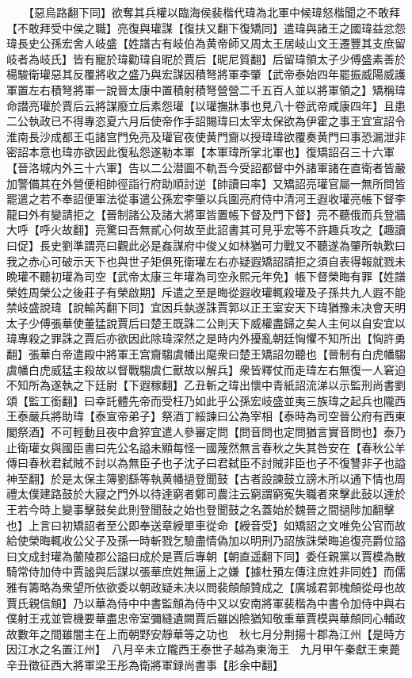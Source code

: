 　　【惡烏路翻下同】欲奪其兵權以臨海侯裴楷代瑋為北軍中候瑋怒楷聞之不敢拜【不敢拜受中侯之職】亮復與瓘謀【復扶又翻下復矯同】遣瑋與諸王之國瑋益忿怨瑋長史公孫宏舍人岐盛【姓譜古有岐伯為黄帝師又周太王居岐山文王遷豐其支庶留岐者為岐氏】皆有寵於瑋勸瑋自昵於賈后【昵尼質翻】后留瑋領太子少傅盛素善於楊駿衛瓘惡其反覆將收之盛乃與宏謀因積弩將軍李肇【武帝泰始四年罷振威陽威護軍置左右積弩將軍一說晉太康中置積射積弩營營二千五百人並以將軍領之】矯稱瑋命譛亮瓘於賈后云將謀廢立后素怨瓘【以瓘撫牀事也見八十卷武帝咸康四年】且患二公執政已不得專恣夏六月后使帝作手詔賜瑋曰太宰太保欲為伊霍之事王宜宣詔令淮南長沙成都王屯諸宫門免亮及瓘官夜使黄門齎以授瑋瑋欲覆奏黄門曰事恐漏泄非密詔本意也瑋亦欲因此復私怨遂勒本軍【本軍瑋所掌北軍也】復矯詔召三十六軍【晉洛城内外三十六軍】告以二公潜圖不軌吾今受詔都督中外諸軍諸在直衛者皆嚴加警備其在外營便相帥徑詣行府助順討逆【帥讀曰率】又矯詔亮瓘官屬一無所問皆罷遣之若不奉詔便軍法從事遣公孫宏李肇以兵圍亮府侍中清河王遐收瓘亮帳下督李龍曰外有變請拒之【晉制諸公及諸大將軍皆置帳下督及門下督】亮不聽俄而兵登牆大呼【呼火故翻】亮驚曰吾無貳心何故至此詔書其可見乎宏等不許趣兵攻之【趣讀曰促】長史劉準謂亮曰觀此必是姦謀府中俊乂如林猶可力戰又不聽遂為肇所執歎曰我之赤心可破示天下也與世子矩俱死衛瓘左右亦疑遐矯詔請拒之須自表得報就戮未晩瓘不聽初瓘為司空【武帝太康三年瓘為司空永熙元年免】帳下督榮晦有罪【姓譜榮姓周榮公之後莊子有榮啟期】斥遣之至是晦從遐收瓘輒殺瓘及子孫共九人遐不能禁岐盛說瑋【說輸芮翻下同】宜因兵埶遂誅賈郭以正王室安天下瑋猶豫未决會天明太子少傅張華使董猛說賈后曰楚王既誅二公則天下威權盡歸之矣人主何以自安宜以瑋專殺之罪誅之賈后亦欲因此除瑋深然之是時内外擾亂朝廷恟懼不知所出【恟許勇翻】張華白帝遣殿中將軍王宫齎騶虞幡出麾衆曰楚王矯詔勿聽也【晉制有白虎幡騶虞幡白虎威猛主殺故以督戰騶虞仁獸故以解兵】衆皆釋仗而走瑋左右無復一人窘迫不知所為遂執之下廷尉【下遐稼翻】乙丑斬之瑋出懷中青紙詔流涕以示監刑尚書劉頌【監工銜翻】曰幸託體先帝而受枉乃如此乎公孫宏岐盛並夷三族瑋之起兵也隴西王泰嚴兵將助瑋【泰宣帝弟子】祭酒丁綏諫曰公為宰相【泰時為司空晉公府有西東閣祭酒】不可輕動且夜中倉猝宜遣人參審定問【問音問也定問猶言實音問也】泰乃止衛瓘女與國臣書曰先公名謚未顯每怪一國蔑然無言春秋之失其咎安在【春秋公羊傳曰春秋君弑賊不討以為無臣子也子沈子曰君弑臣不討賊非臣也子不復讐非子也謚神至翻】於是太保主簿劉繇等執黄幡撾登聞鼓【古者設諫鼓立謗木所以通下情也周禮太僕建路鼓於大寢之門外以待達窮者鄭司農注云窮謂窮寃失職者來擊此鼔以達於王若今時上變事擊鼓矣此則登聞鼔之始也登聞鼓之名蓋始於魏晉之間撾陟加翻擊也】上言曰初矯詔者至公即奉送章綬單車從命【綬音受】如矯詔之文唯免公官而故給使榮晦輒收公父子及孫一時斬戮乞驗盡情偽加以明刑乃詔族誅榮晦追復亮爵位謚曰文成封瓘為蘭陵郡公謚曰成於是賈后專朝【朝直遥翻下同】委任親黨以賈模為散騎常侍加侍中賈謐與后謀以張華庶姓無逼上之嫌【據杜預左傳注庶姓非同姓】而儒雅有籌略為衆望所依欲委以朝政疑未决以問裴頠頠贊成之【廣城君郭槐頠從母也故賈氏親信頠】乃以華為侍中中書監頠為侍中又以安南將軍裴楷為中書令加侍中與右僕射王戎並管機要華盡忠帝室彌縫遺闕賈后雖凶險猶知敬重華賈模與華頠同心輔政故數年之間雖闇主在上而朝野安靜華等之功也　秋七月分荆揚十郡為江州【是時方因江水之名置江州】　八月辛未立隴西王泰世子越為東海王　九月甲午秦獻王柬薨　辛丑徵征西大將軍梁王彤為衛將軍録尚書事【肜余中翻】

